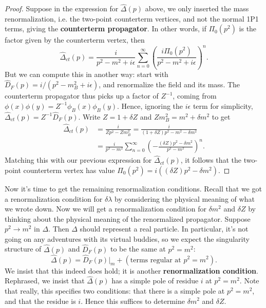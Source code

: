\documentclass{report}
\theoremstyle{plain}
\theoremstyle{definition}
\theoremstyle{remark}
\begin{document}
\begin{proof}
  Suppose in the expression for $\widehat{\Delta}(p)$ above, we only
  inserted the mass renormalization, i.e. the two-point counterterm
  vertices, and not the normal 1P1 terms, giving the {\bf counterterm
    propagator}. In other words, if $\Pi_0(p^2)$ is the factor given by
  the counterterm vertex, then
  $$ \widehat{\Delta}_{ct}(p) = \frac{i}{p^2 - m^2 + i\epsilon} \sum_{n=0}^\infty \left(\frac{i \Pi_0(p^2)}{p^2 - m^2 + i\epsilon}\right)^n. $$
  But we can compute this in another way: start with
  $\widehat{D}_F(p) = i/(p^2 - m_B^2 + i\epsilon)$, and renormalize
  the field and its mass. The counterterm propagator thus picks up a
  factor of $Z^{-1}$, coming from
  $\phi(x)\phi(y) = Z^{-1}\phi_B(x)\phi_B(y)$. Hence, ignoring the
  $i\epsilon$ term for simplicity,
  $\widehat{\Delta}_{ct}(p) = Z^{-1}\widehat{D}_F(p)$. Write
  $Z = 1 + \delta Z$ and $Zm_B^2 = m^2 + \delta m^2$ to get
  \begin{align*}
    \widehat{\Delta}_{ct}(p) 
    &= \frac{i}{Zp^2 - Zm_B^2} = \frac{i}{(1 + \delta Z)p^2 - m^2 - \delta m^2} \\
    &= \frac{i}{p^2 - m^2} \sum_{n=0}^\infty \left(-\frac{(\delta Z)p^2 - \delta m^2}{p^2 - m^2}\right)^n.
  \end{align*}
  Matching this with our previous expression for
  $\widehat{\Delta}_{ct}(p)$, it follows that the two-point
  counterterm vertex has value
  $\Pi_0(p^2) = i((\delta Z)p^2 - \delta m^2)$.
\end{proof}

Now it's time to get the remaining renormalization conditions. Recall
that we got a renormalization condition for $\delta \lambda$ by
considering the physical meaning of what we wrote down. Now we will
get a renormalization condition for $\delta m^2$ and $\delta Z$ by
thinking about the physical meaning of the renormalized propagator.
Suppose $p^2 \to m^2$ in $\Delta$. Then $\Delta$ should represent a
real particle. In particular, it's not going on any adventures with
its virtual buddies, so we expect the singularity structure of
$\widehat{\Delta}(p)$ and $\widehat{D}_F(p)$ to be the same at
$p^2 = m^2$:
$$ \widehat{\Delta}(p) = \widehat{D}_F(p)|_m + (\text{terms regular at } p^2 = m^2). $$
We insist that this indeed does hold; it is another {\bf
  renormalization condition}. Rephrased, we insist that
$\widehat{\Delta}(p)$ has a simple pole of residue $i$ at $p^2 = m^2$.
Note that really, this specifies two conditions: that there is a
simple pole at $p^2 = m^2$, and that the residue is $i$. Hence this
suffices to determine $\delta m^2$ and $\delta Z$.
\end{document}
